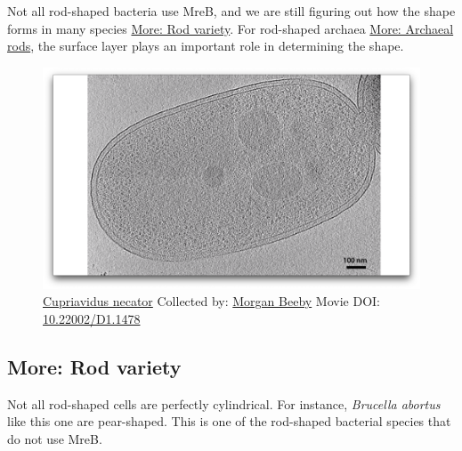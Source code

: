 \documentclass[]{tufte-book}
\begin{document}
Not all rod-shaped bacteria use MreB, and we are still figuring out how
the shape forms in many species \protect\hyperlink{Rod_variety}{More:
Rod variety}. For rod-shaped archaea
\protect\hyperlink{Archaeal_rods}{More: Archaeal rods}, the surface
layer plays an important role in determining the shape.





\begin{figure}
\includegraphics{movie_stills/3_2} \caption[\protect\hyperlink{tree}{Cupriavidus necator} Collected by:
\protect\hyperlink{morgan_beeby}{Morgan Beeby} Movie DOI:
\href{https://doi.org/10.22002/D1.1478}{10.22002/D1.1478}]{\protect\hyperlink{tree}{Cupriavidus necator} Collected by:
\protect\hyperlink{morgan_beeby}{Morgan Beeby} Movie DOI:
\href{https://doi.org/10.22002/D1.1478}{10.22002/D1.1478}}\label{fig:3-2}
\end{figure}

\hypertarget{Rod_variety}{\subsection*{More: Rod
variety}\label{Rod_variety}}

Not all rod-shaped cells are perfectly cylindrical. For instance,
\emph{Brucella abortus} like this one are pear-shaped. This is one of
the rod-shaped bacterial species that do not use MreB.
\end{document}
